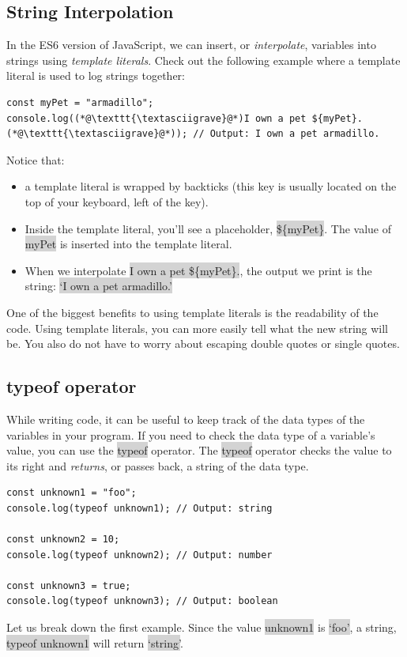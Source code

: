 \documentclass[11pt]{article}
\begin{document}
\subsection{String Interpolation}
In the ES6 version of JavaScript, we can insert, or \textit{interpolate}, variables into strings using \textit{template literals}. Check out the following example where a template literal is used to log strings together:
\textasciigrave
\begin{lstlisting}
const myPet = "armadillo";
console.log((*@\texttt{\textasciigrave}@*)I own a pet ${myPet}.(*@\texttt{\textasciigrave}@*)); // Output: I own a pet armadillo.
\end{lstlisting}
Notice that:
\begin{itemize}[leftmargin = *]
\item a template literal is wrapped by backticks \colorbox{lightgray}{\textasciigrave} (this key is usually located on the top of your keyboard, left of the  key).
\item Inside the template literal, you’ll see a placeholder, \colorbox{lightgray}{\$\{myPet\}}. The value of \colorbox{lightgray}{myPet} is inserted into the template literal.
\item When we interpolate \colorbox{lightgray}{\textasciigrave I own a pet \$\{myPet\}.\textasciigrave}, the output we print is the string: \colorbox{lightgray}{`I own a pet armadillo.'}
\end{itemize}
One of the biggest benefits to using template literals is the readability of the code. Using template literals, you can more easily tell what the new string will be. You also do not have to worry about escaping double quotes or single quotes. 

\subsection{typeof operator}
While writing code, it can be useful to keep track of the data types of the variables in your program. If you need to check the data type of a variable’s value, you can use the \colorbox{lightgray}{typeof} operator. The \colorbox{lightgray}{typeof} operator checks the value to its right and \textit{returns}, or passes back, a string of the data type. 
\begin{lstlisting}
const unknown1 = "foo";
console.log(typeof unknown1); // Output: string

const unknown2 = 10;
console.log(typeof unknown2); // Output: number

const unknown3 = true; 
console.log(typeof unknown3); // Output: boolean
\end{lstlisting}
Let us break down the first example. Since the value \colorbox{lightgray}{unknown1} is \colorbox{lightgray}{`foo'}, a string, \colorbox{lightgray}{typeof unknown1} will return \colorbox{lightgray}{`string'}.
\end{document}
